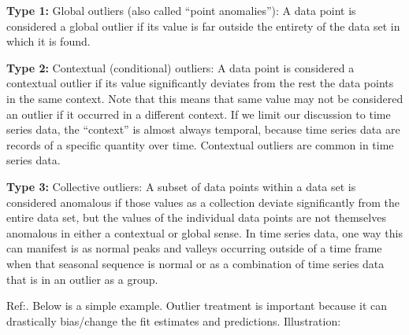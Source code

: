 \documentclass[]{book}
\theoremstyle{definition}
\theoremstyle{definition}
\theoremstyle{definition}
\theoremstyle{remark}
\begin{document}
\textbf{Type 1:} Global outliers (also called ``point anomalies''): A
data point is considered a global outlier if its value is far outside
the entirety of the data set in which it is found.

\textbf{Type 2:} Contextual (conditional) outliers: A data point is
considered a contextual outlier if its value significantly deviates from
the rest the data points in the same context. Note that this means that
same value may not be considered an outlier if it occurred in a
different context. If we limit our discussion to time series data, the
``context'' is almost always temporal, because time series data are
records of a specific quantity over time. Contextual outliers are common
in time series data.

\textbf{Type 3:} Collective outliers: A subset of data points within a
data set is considered anomalous if those values as a collection deviate
significantly from the entire data set, but the values of the individual
data points are not themselves anomalous in either a contextual or
global sense. In time series data, one way this can manifest is as
normal peaks and valleys occurring outside of a time frame when that
seasonal sequence is normal or as a combination of time series data that
is in an outlier as a group.

Ref:\citep{outliar}. Below is a simple example. Outlier treatment is
important because it can drastically bias/change the fit estimates and
predictions. Illustration:
\end{document}
